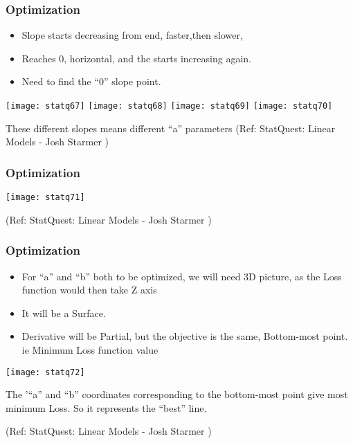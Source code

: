 \begin{frame}[fragile]\frametitle{Optimization}
\begin{itemize}
\item Slope starts decreasing from end, faster,then slower,
\item Reaches 0, horizontal, and the starts increasing again.
\item Need to find the ``0'' slope point.
\end{itemize}

\begin{center}
\texttt{[image: statq67]}
\texttt{[image: statq68]}
\texttt{[image: statq69]}
\texttt{[image: statq70]}
\end{center}

These different slopes means different ``a'' parameters
\tiny{(Ref: StatQuest: Linear Models - Josh Starmer )}	

\end{frame}


\begin{frame}[fragile]\frametitle{Optimization}

\begin{center}
\texttt{[image: statq71]}
\end{center}

\tiny{(Ref: StatQuest: Linear Models - Josh Starmer )}	

\end{frame}


\begin{frame}[fragile]\frametitle{Optimization}
\begin{itemize}
\item For ``a'' and ``b'' both to be optimized, we will need 3D picture, as the Loss function would then take Z axis
\item It will be a Surface.
\item Derivative will be Partial, but the objective is the same, Bottom-most point. ie Minimum Loss function value
\end{itemize}

\begin{center}
\texttt{[image: statq72]}
\end{center}

The '``a'' and ``b'' coordinates corresponding to the bottom-most point give most minimum Loss. So it represents the ``best'' line.

\tiny{(Ref: StatQuest: Linear Models - Josh Starmer )}	

\end{frame}

